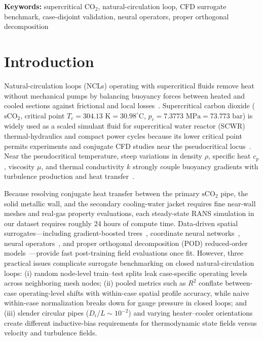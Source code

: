 \documentclass[11pt]{article}
\begin{document}
\begin{abstract}
\texttt{POD-RBF} and \texttt{POD-GPR} achieve the lowest median case nMAE on temperature ($0.974$), $\varepsilon$ ($0.150$ for \texttt{POD-GPR}; $0.177$ for \texttt{POD-RBF}), and $k$ ($0.237$ for \texttt{POD-RBF}; $0.245$ for \texttt{POD-GPR}) when interpolating on a fixed loop mesh.
\end{abstract}

\medskip\noindent\textbf{Keywords:} supercritical $\mathrm{CO}_2$, natural-circulation loop, CFD surrogate benchmark, case-disjoint validation, neural operators, proper orthogonal decomposition

\section{Introduction}
Natural-circulation loops (NCLs) operating with supercritical fluids remove heat without mechanical pumps by balancing buoyancy forces between heated and cooled sections against frictional and local losses~\cite{swapnalee2012generalized,vijayan2002experimental,pioro2007heat}. Supercritical carbon dioxide ($\mathrm{sCO}_2$, critical point $T_c = 304.13\text{ K} = 30.98^\circ\text{C}$, $p_c = 7.3773\text{ MPa} = 73.773\text{ bar}$) is widely used as a scaled simulant fluid for supercritical water reactor (SCWR) thermal-hydraulics and compact power cycles because its lower critical point permits experiments and conjugate CFD studies near the pseudocritical locus~\cite{span1996new,dostal2004supercritical,bae2005mixed}. Near the pseudocritical temperature, steep variations in density $\rho$, specific heat $c_p$, viscosity $\mu$, and thermal conductivity $k$ strongly couple buoyancy gradients with turbulence production and heat transfer~\cite{kurganov2013heat,sarkar2014entropy,chen2013numerical}.

Because resolving conjugate heat transfer between the primary $\mathrm{sCO}_2$ pipe, the solid metallic wall, and the secondary cooling-water jacket requires fine near-wall meshes and real-gas property evaluations, each steady-state RANS simulation in our dataset requires roughly 24 hours of compute time. Data-driven spatial surrogates---including gradient-boosted trees~\cite{friedman2001greedy,chen2016xgboost,prokhorenkova2018catboost}, coordinate neural networks~\cite{raissi2019physics,tancik2020fourier,perez2018film}, neural operators~\cite{lu2021learning,li2021fourier,wen2022ufno,wu2024transolver}, and proper orthogonal decomposition (POD) reduced-order models~\cite{berkooz1993proper,audouze2009nonintrusive}---provide fast post-training field evaluations once fit. However, three practical issues complicate surrogate benchmarking on closed natural-circulation loops: (i) random node-level train--test splits leak case-specific operating levels across neighboring mesh nodes; (ii) pooled metrics such as $R^2$ conflate between-case operating-level shifts with within-case spatial profile accuracy, while naive within-case normalization breaks down for gauge pressure in closed loops; and (iii) slender circular pipes ($D_i/L \sim 10^{-2}$) and varying heater--cooler orientations create different inductive-bias requirements for thermodynamic state fields versus velocity and turbulence fields.
\end{document}
